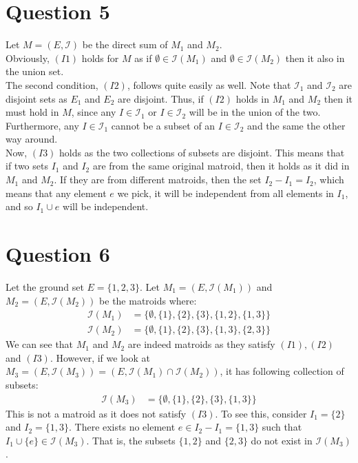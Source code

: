 \documentclass[a4paper, fleqn]{article}
\begin{document}
\section*{Question 5}
Let $M=(E,\mathcal{I})$ be the direct sum of $M_1$ and $M_2$. \\ 
Obviously, $(I1)$ holds for $M$ as if $\emptyset\in \mathcal{I}(M_1)$ and $\emptyset\in \mathcal{I}(M_2)$ then it also in the union set. \\
The second condition, $(I2)$, follows quite easily as well. Note that $\mathcal{I}_1$ and $\mathcal{I}_2$ are disjoint sets as $E_1$ and $E_2$ are disjoint. Thus, if $(I2)$ holds in $M_1$ and $M_2$ then it must hold in $M$, since any $I\in \mathcal{I}_1$ or $I\in \mathcal{I}_2$ will be in the union of the two. Furthermore, any $I\in \mathcal{I}_1$ cannot be a subset of an $I\in \mathcal{I}_2$ and the same the other way around. \\
Now, $(I3)$ holds as the two collections of subsets are disjoint. This means that if two sets $I_1$ and $I_2$ are from the same original matroid, then it holds as it did in $M_1$ and $M_2$. If they are from different matroids, then the set $I_2-I_1=I_2$, which means that any element $e$ we pick, it will be independent from all elements in $I_1$, and so $I_1\cup e$ will be independent.

\section*{Question 6}
Let the ground set $E=\{1,2,3\}$. Let $M_1=(E, \mathcal{I}(M_1))$ and $M_2=(E, \mathcal{I}(M_2))$ be the matroids where:
\begin{align*}
  \mathcal{I}(M_1)&=\{\emptyset, \{1\}, \{2\}, \{3\}, \{1,2\}, \{1,3\}\} \\
  \mathcal{I}(M_2)&=\{\emptyset, \{1\}, \{2\}, \{3\}, \{1,3\}, \{2,3\}\}
\end{align*}
We can see that $M_1$ and $M_2$ are indeed matroids as they satisfy $(I1),(I2)$ and $(I3)$. However, if we look at $M_3=(E, \mathcal{I}(M_3))=(E, \mathcal{I}(M_1)\cap \mathcal{I}(M_2))$, it has following collection of subsets:
\begin{align*}
  \mathcal{I}(M_3)&=\{\emptyset, \{1\}, \{2\}, \{3\}, \{1,3\}\}
\end{align*}
This is not a matroid as it does not satisfy $(I3)$. To see this, consider $I_1=\{2\}$ and $I_2=\{1,3\}$. There exists no element $e\in I_2-I_1=\{1,3\}$ such that $I_1\cup \{e\}\in \mathcal{I}(M_3)$. That is, the subsets $\{1,2\}$ and $\{2,3\}$ do not exist in $\mathcal{I}(M_3)$.
\end{document}
